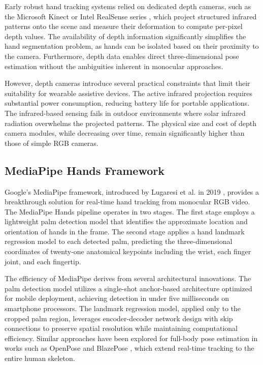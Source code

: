\documentclass[12pt,a4paper]{report}
\begin{document}
Early robust hand tracking systems relied on dedicated depth cameras, such as the Microsoft Kinect \cite{kinect} or Intel RealSense series \cite{realsense}, which project structured infrared patterns onto the scene and measure their deformation to compute per-pixel depth values. The availability of depth information significantly simplifies the hand segmentation problem, as hands can be isolated based on their proximity to the camera. Furthermore, depth data enables direct three-dimensional pose estimation without the ambiguities inherent in monocular approaches.

However, depth cameras introduce several practical constraints that limit their suitability for wearable assistive devices. The active infrared projection requires substantial power consumption, reducing battery life for portable applications. The infrared-based sensing fails in outdoor environments where solar infrared radiation overwhelms the projected patterns. The physical size and cost of depth camera modules, while decreasing over time, remain significantly higher than those of simple RGB cameras.

\subsection{MediaPipe Hands Framework}

Google's MediaPipe framework, introduced by Lugaresi et al. in 2019 \cite{mediapipe}, provides a breakthrough solution for real-time hand tracking from monocular RGB video. The MediaPipe Hands pipeline operates in two stages. The first stage employs a lightweight palm detection model that identifies the approximate location and orientation of hands in the frame. The second stage applies a hand landmark regression model to each detected palm, predicting the three-dimensional coordinates of twenty-one anatomical keypoints including the wrist, each finger joint, and each fingertip.

The efficiency of MediaPipe derives from several architectural innovations. The palm detection model utilizes a single-shot anchor-based architecture optimized for mobile deployment, achieving detection in under five milliseconds on smartphone processors. The landmark regression model, applied only to the cropped palm region, leverages encoder-decoder network design with skip connections to preserve spatial resolution while maintaining computational efficiency. Similar approaches have been explored for full-body pose estimation in works such as OpenPose \cite{openpose} and BlazePose \cite{blazepose}, which extend real-time tracking to the entire human skeleton.
\end{document}
